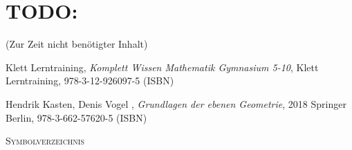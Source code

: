 \documentclass[a4paper]{amsart}
\theoremstyle{definition}
\begin{document}
\section{TODO:}
\begin{backup}
    (Zur Zeit nicht benötigter Inhalt)
\end{backup}

\begin{thebibliography}{9}

      Klett Lerntraining, \emph{Komplett Wissen Mathematik Gymnasium 5-10},
      Klett Lerntraining, 978-3-12-926097-5 (ISBN)
      
       Hendrik Kasten, Denis Vogel , \emph{Grundlagen der ebenen Geometrie},
      2018 Springer Berlin, 978-3-662-57620-5 (ISBN)

\end{thebibliography}

\begin{large}
    \centerline{\textsc{Symbolverzeichnis}}
\end{large}
\bigskip

\renewcommand*{\arraystretch}{1}
\end{document}
